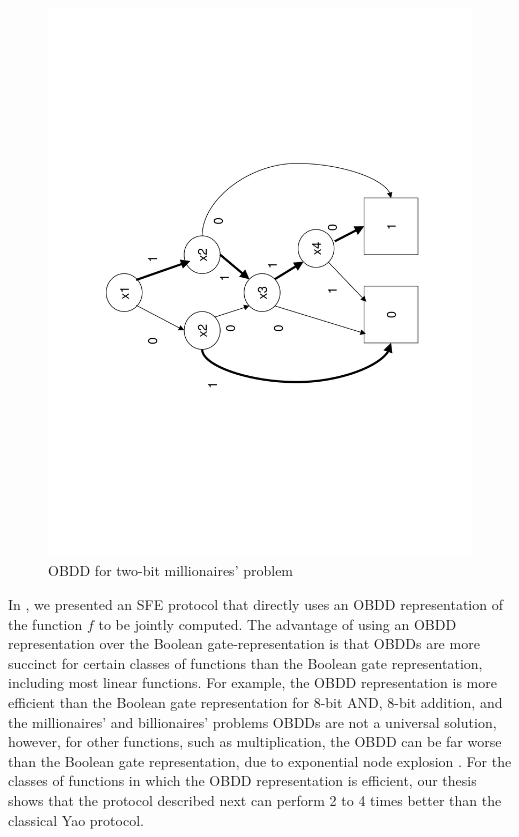 %
\begin{figure}
\begin{centering}
\includegraphics[scale=0.4,angle=270]{obdd1}
\par\end{centering}

\caption{\label{fig:OBDD-example}OBDD for two-bit millionaires' problem}

\end{figure}


In \cite{kruger06}, we presented an SFE protocol that directly uses
an OBDD representation of the function $f$ to be jointly computed.
The advantage of using an OBDD representation over the Boolean gate-representation
is that OBDDs are more succinct for certain classes of functions than
the Boolean gate representation, including most linear functions.
For example, the OBDD representation is more efficient than the Boolean
gate representation for 8-bit AND, 8-bit addition, and the millionaires'
and billionaires' problems \cite{Yao86} OBDDs are not a universal
solution, however, for other functions, such as multiplication, the
OBDD can be far worse than the Boolean gate representation, due to
exponential node explosion \cite{Bryant:BDD}. For the classes of
functions in which the OBDD representation is efficient, our thesis
\cite{kruger06} shows that the protocol described next can perform
2 to 4 times better than the classical Yao protocol.

